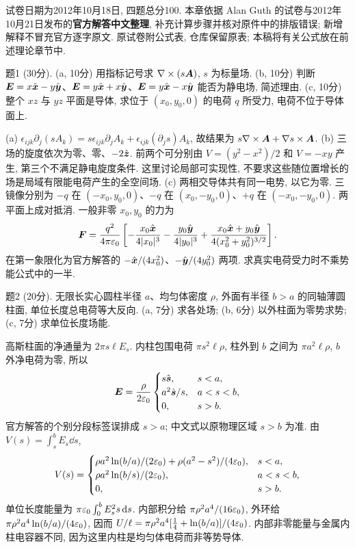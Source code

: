 试卷日期为2012年10月18日, 四题总分100. 本章依据 Alan Guth 的试卷与2012年10月21日发布的\textbf{官方解答中文整理}, 补充计算步骤并核对原件中的排版错误; 新增解释不冒充官方逐字原文. 原试卷附公式表, 仓库保留原表; 本稿将有关公式放在前述理论章节中.

\begin{exercise}
题1 (30分). (a, 10分) 用指标记号求 $\nabla\times(s\boldsymbol{A})$, $s$ 为标量场. (b, 10分) 判断 $\boldsymbol{E}=x\hat{\boldsymbol{x}}-y\hat{\boldsymbol{y}}$、$\boldsymbol{E}=y\hat{\boldsymbol{x}}+x\hat{\boldsymbol{y}}$、$\boldsymbol{E}=y\hat{\boldsymbol{x}}-x\hat{\boldsymbol{y}}$ 能否为静电场, 简述理由. (c, 10分) 整个 $xz$ 与 $yz$ 平面是导体, 求位于 $(x_0,y_0,0)$ 的电荷 $q$ 所受力, 电荷不位于导体面上.
\end{exercise}
\begin{solution}
(a) $\epsilon_{ijk}\partial_j(sA_k)=s\epsilon_{ijk}\partial_jA_k+\epsilon_{ijk}(\partial_js)A_k$, 故结果为 $s\nabla\times\boldsymbol{A}+\nabla s\times\boldsymbol{A}$.
(b) 三场的旋度依次为零、零、$-2\hat{\boldsymbol{z}}$. 前两个可分别由 $V=(y^2-x^2)/2$ 和 $V=-xy$ 产生, 第三个不满足静电旋度条件. 这里讨论局部可实现性, 不要求这些随位置增长的场是局域有限能电荷产生的全空间场.
(c) 两相交导体共有同一电势, 以它为零. 三镜像分别为 $-q$ 在 $(-x_0,y_0,0)$、$-q$ 在 $(x_0,-y_0,0)$、$+q$ 在 $(-x_0,-y_0,0)$. 两平面上成对抵消. 一般非零 $x_0,y_0$ 的力为
\[
\boldsymbol{F}=\frac{q^2}{4\pi\varepsilon_0}\left[-\frac{x_0\hat{\boldsymbol{x}}}{4|x_0|^3}
-\frac{y_0\hat{\boldsymbol{y}}}{4|y_0|^3}
+\frac{x_0\hat{\boldsymbol{x}}+y_0\hat{\boldsymbol{y}}}{4(x_0^2+y_0^2)^{3/2}}\right].
\]
在第一象限化为官方解答的 $-\hat{\boldsymbol{x}}/(4x_0^2)$、$-\hat{\boldsymbol{y}}/(4y_0^2)$ 两项. 求真实电荷受力时不乘势能公式中的一半.
\end{solution}

\begin{exercise}
题2 (20分). 无限长实心圆柱半径 $a$、均匀体密度 $\rho$, 外面有半径 $b>a$ 的同轴薄圆柱面, 单位长度总电荷等大反向. (a, 7分) 求各处场; (b, 6分) 以外柱面为零势求势; (c, 7分) 求单位长度场能.
\end{exercise}
\begin{solution}
高斯柱面的净通量为 $2\pi s\ell E_s$. 内柱包围电荷 $\pi s^2\ell\rho$, 柱外到 $b$ 之间为 $\pi a^2\ell\rho$, $b$ 外净电荷为零, 所以
\[
\boldsymbol{E}=\frac\rho{2\varepsilon_0}\begin{cases}s\hat{\boldsymbol{s}},&s<a,\\ a^2\hat{\boldsymbol{s}}/s,&a<s<b,\\0,&s>b.\end{cases}
\]
官方解答的个别分段标签误排成 $s>a$; 中文式以原物理区域 $s>b$ 为准. 由 $V(s)=\int_s^bE_s\dd s$,
\[
V(s)=\begin{cases}
\rho a^2\ln(b/a)/(2\varepsilon_0)+\rho(a^2-s^2)/(4\varepsilon_0),&s<a,\\
\rho a^2\ln(b/s)/(2\varepsilon_0),&a<s<b,\\0,&s>b.
\end{cases}
\]
单位长度能量为 $\pi\varepsilon_0\int_0^bE_s^2s\,\mathrm d s$. 内部积分给 $\pi\rho^2a^4/(16\varepsilon_0)$, 外环给 $\pi\rho^2a^4\ln(b/a)/(4\varepsilon_0)$, 因而
$U/\ell=\pi\rho^2a^4[\frac14+\ln(b/a)]/(4\varepsilon_0)$. 内部非零能量与金属内柱电容器不同, 因为这里内柱是均匀体电荷而非等势导体.
\end{solution}

